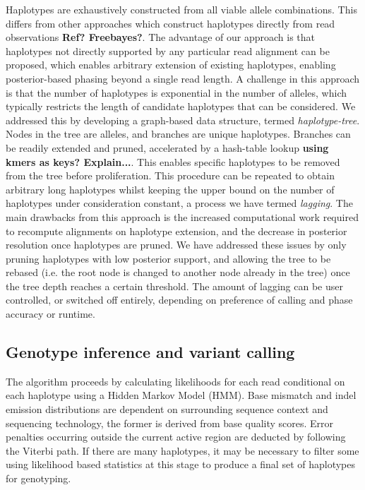 \documentclass[notitlepage, twocolumn]{article}
\begin{document}
Haplotypes are exhaustively constructed from all viable allele combinations. This differs from other approaches which construct haplotypes directly from read observations {\bf Ref?  Freebayes?}. The advantage of our approach is that haplotypes not directly supported by any particular read alignment can be proposed, which enables arbitrary extension of existing haplotypes, enabling posterior-based phasing beyond a single read length. A challenge in this approach is that the number of haplotypes is exponential in the number of alleles, which typically restricts the length of candidate haplotypes that can be considered. We addressed this by developing a graph-based data structure, termed \emph{haplotype-tree}. Nodes in the tree are alleles, and branches are unique haplotypes. Branches can be readily extended and pruned, accelerated by a hash-table lookup {\bf using kmers as keys?  Explain...}. This enables specific haplotypes to be removed from the tree before proliferation. This procedure can be repeated to obtain arbitrary long haplotypes whilst keeping the upper bound on the number of haplotypes under consideration constant, a process we have termed \emph{lagging}. The main drawbacks from this approach is the increased computational work required to recompute alignments on haplotype extension, and the decrease in posterior resolution once haplotypes are pruned. We have addressed these issues by only pruning haplotypes with low posterior support, and allowing the tree to be rebased (i.e. the root node is changed to another node already in the tree) once the tree depth reaches a certain threshold. The amount of lagging can be user controlled, or switched off entirely, depending on preference of calling and phase accuracy or runtime.

\subsection*{Genotype inference and variant calling}

The algorithm proceeds by calculating likelihoods for each read conditional on each haplotype using a Hidden Markov Model (HMM). Base mismatch and indel emission distributions are dependent on surrounding sequence context and sequencing technology, the former is derived from base quality scores. Error penalties occurring outside the current active region are deducted by following the Viterbi path. If there are many haplotypes, it may be necessary to filter some using likelihood based statistics at this stage to produce a final set of haplotypes for genotyping.
\end{document}
